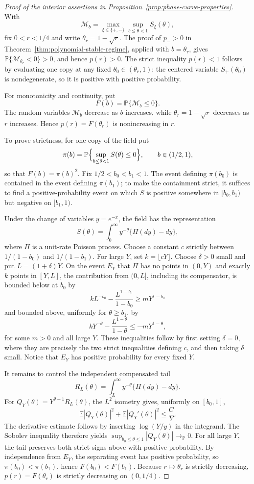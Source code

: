 \begin{proof}[Proof of the interior assertions in
Proposition~\ref{prop:phase-curve-properties}]
With
\[
    \mathcal M_b
    =
    \max_{\xi\in\{+,-\}}
    \sup_{b\le\theta<1}S_\xi(\theta),
\]
fix $0<r<1/4$ and write $\theta_r=1-\sqrt r$. The proof of $p_->0$ in Theorem~\ref{thm:polynomial-stable-regime}, applied with $b=\theta_r$, gives $\mathbb P\{\mathcal M_{\theta_r}<0\}>0$, and hence $p(r)>0$. The strict inequality $p(r)<1$ follows by evaluating one copy at any fixed $\theta_0\in(\theta_r,1)$: the centered variable $S_+(\theta_0)$ is nondegenerate, so it is positive with positive probability.

For monotonicity and continuity, put
\[
    F(b)=\mathbb P\{\mathcal M_b\le0\}.
\]
The random variables $\mathcal M_b$ decrease as $b$ increases, while $\theta_r=1-\sqrt r$ decreases as $r$ increases. Hence $p(r)=F(\theta_r)$ is nonincreasing in $r$.

To prove strictness, for one copy of the field put
\[
    \pi(b)=\mathbb P\Bigl\{\sup_{b\le\theta<1}S(\theta)\le0\Bigr\},
    \qquad b\in(1/2,1),
\]
so that \(F(b)=\pi(b)^2\). Fix \(1/2<b_0<b_1<1\). The event defining
\(\pi(b_0)\) is contained in the event defining \(\pi(b_1)\); to make the
containment strict, it suffices to find a positive-probability event on which
\(S\) is positive somewhere in \([b_0,b_1)\) but negative on \([b_1,1)\).

Under the change of variables \(y=e^{-x}\), the field has the representation
\[
    S(\theta)=\int_0^\infty y^{-\theta}\{\Pi(dy)-dy\},
\]
where \(\Pi\) is a unit-rate Poisson process. Choose a constant \(c\) strictly
between \(1/(1-b_0)\) and \(1/(1-b_1)\). For large \(Y\), set
\(k=\lfloor cY\rfloor\). Choose \(\delta>0\) small and put
\(L=(1+\delta)Y\). On the event \(E_Y\) that \(\Pi\) has no points in
\((0,Y)\) and exactly \(k\) points in \([Y,L]\), the contribution from
\((0,L]\), including its compensator, is bounded below at \(b_0\) by
\[
 kL^{-b_0}-\frac{L^{1-b_0}}{1-b_0}
 \ge mY^{1-b_0}
\]
and bounded above, uniformly for \(\theta\ge b_1\), by
\[
 kY^{-\theta}-\frac{L^{1-\theta}}{1-\theta}
 \le -mY^{1-\theta},
\]
for some \(m>0\) and all large \(Y\). These inequalities follow by first
setting \(\delta=0\), where they are precisely the two strict inequalities
defining \(c\), and then taking \(\delta\) small. Notice that \(E_Y\) has
positive probability for every fixed \(Y\).

It remains to control the independent compensated tail
\[
 R_L(\theta)=\int_L^\infty y^{-\theta}\{\Pi(dy)-dy\}.
\]
For \(Q_Y(\theta)=Y^{\theta-1}R_L(\theta)\), the \(L^2\) isometry gives,
uniformly on \([b_0,1]\),
\[
 \mathbb E|Q_Y(\theta)|^2+
 \mathbb E|Q_Y'(\theta)|^2\le \frac{C}{Y}.
\]
The derivative estimate follows by inserting
\(\log(Y/y)\) in the integrand. The Sobolev inequality therefore yields
\(\sup_{b_0\le\theta\le1}|Q_Y(\theta)|\to_{\mathbb P}0\). For all large
\(Y\), the tail preserves both strict signs above with positive probability.
By independence from \(E_Y\), the separating event has positive probability,
so \(\pi(b_0)<\pi(b_1)\), hence \(F(b_0)<F(b_1)\). Because
\(r\mapsto\theta_r\) is strictly decreasing, \(p(r)=F(\theta_r)\) is strictly
decreasing on \((0,1/4)\).


\end{proof}
